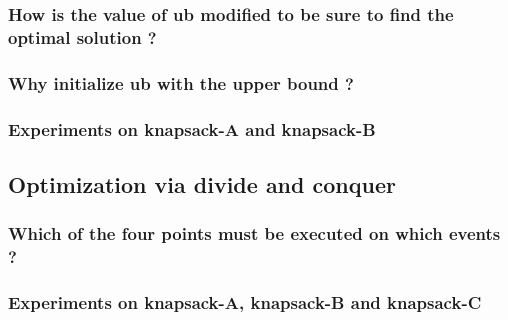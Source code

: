 \documentclass{eplDoc}
\begin{document}
\subsubsection{How is the value of ub modified to be sure to find the optimal solution ?}
\subsubsection{Why initialize ub with the upper bound ?}
\subsubsection{Experiments on knapsack-A and knapsack-B}


\subsection{Optimization via divide and conquer} %
\subsubsection{Which of the four points must be executed on which events ?}
\subsubsection{Experiments on knapsack-A, knapsack-B and knapsack-C}
\end{document}
